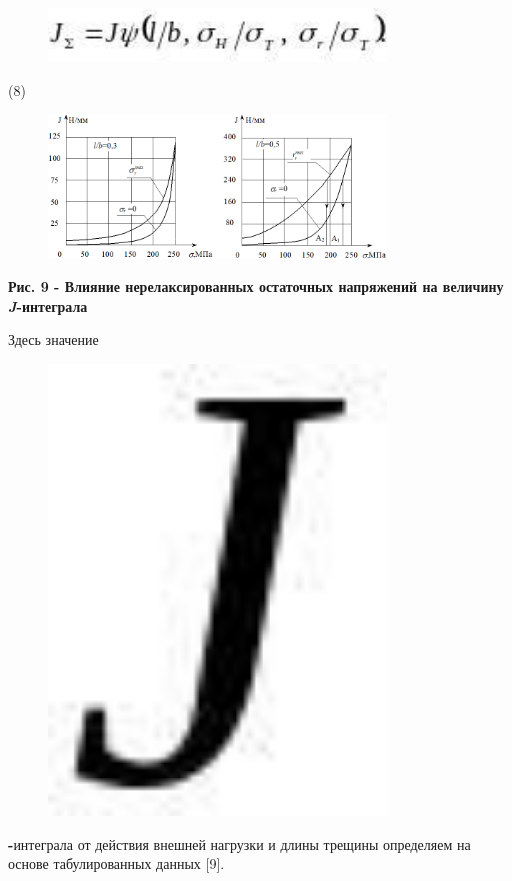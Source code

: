 \begin{figure}[H]
	\centering
	\includegraphics[width=0.8\textwidth]{assets/1244}
	\caption*{}
\end{figure} (8)

\begin{figure}[H]
	\centering
	\includegraphics[width=0.8\textwidth]{assets/1245}
	\caption*{}
\end{figure}

{\bfseries Рис. 9 - Влияние нерелаксированных остаточных напряжений на
величину \emph{J}-интеграла}

Здесь значение \begin{figure}[H]
	\centering
	\includegraphics[width=0.8\textwidth]{assets/1246}
	\caption*{}
\end{figure}{\bfseries -}интеграла
от действия внешней нагрузки и длины трещины определяем на основе
табулированных данных {[}9{]}.

